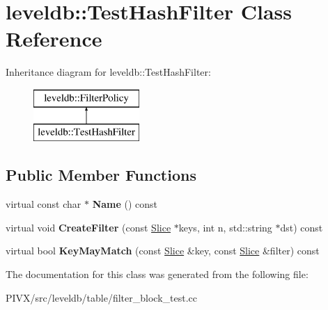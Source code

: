 \hypertarget{classleveldb_1_1_test_hash_filter}{}\section{leveldb\+:\+:Test\+Hash\+Filter Class Reference}
\label{classleveldb_1_1_test_hash_filter}
Inheritance diagram for leveldb\+:\+:Test\+Hash\+Filter\+:\begin{figure}[H]
\begin{center}
\leavevmode
\includegraphics[height=2.000000cm]{classleveldb_1_1_test_hash_filter}
\end{center}
\end{figure}
\subsection*{Public Member Functions}
\begin{DoxyCompactItemize}
\item 
\mbox{\label{classleveldb_1_1_test_hash_filter_ab850484e0c3d5fa3721c91eab9fc83a4}} 
virtual const char $\ast$ {\bfseries Name} () const
\item 
\mbox{\label{classleveldb_1_1_test_hash_filter_ac51313bc9f5f4fd64b49ae8c956bfc00}} 
virtual void {\bfseries Create\+Filter} (const \mbox{\hyperlink{classleveldb_1_1_slice}{Slice}} $\ast$keys, int n, std\+::string $\ast$dst) const
\item 
\mbox{\label{classleveldb_1_1_test_hash_filter_ae2d2ab00456a3ac3d3c5e04e6829ed72}} 
virtual bool {\bfseries Key\+May\+Match} (const \mbox{\hyperlink{classleveldb_1_1_slice}{Slice}} \&key, const \mbox{\hyperlink{classleveldb_1_1_slice}{Slice}} \&filter) const
\end{DoxyCompactItemize}


The documentation for this class was generated from the following file\+:\begin{DoxyCompactItemize}
\item 
P\+I\+V\+X/src/leveldb/table/filter\+\_\+block\+\_\+test.\+cc\end{DoxyCompactItemize}
